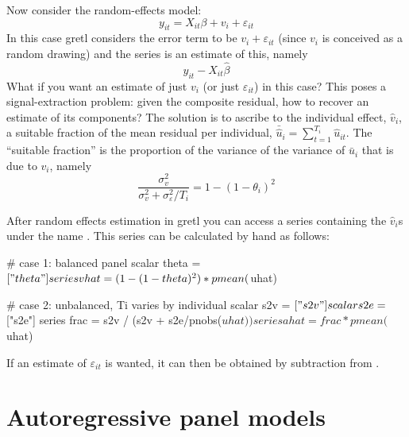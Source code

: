 Now consider the random-effects model:
\[
y_{it} = X_{it}\beta + v_i + \varepsilon_{it}
\]
In this case gretl considers the error term to be
$v_i + \varepsilon_{it}$ (since $v_i$ is conceived as a random
drawing) and the  series is an estimate of this, namely
\[
y_{it} - X_{it}\hat{\beta}
\]
What if you want an estimate of just $v_i$ (or just
$\varepsilon_{it}$) in this case? This poses a signal-extraction
problem: given the composite residual, how to recover an estimate of
its components? The solution is to ascribe to the individual effect,
$\hat{v}_i$, a suitable fraction of the mean residual per individual,
$\bar{\hat{u}}_i = \sum_{t=1}^{T_i} \hat{u}_{it}$. The ``suitable
fraction'' is the proportion of the variance of the variance of
$\bar{u}_i$ that is due to $v_i$, namely
\[
\frac{\sigma^2_v}{\sigma^2_v + \sigma^2_{\varepsilon}/T_i} =
 1 - (1-\theta_i)^2
\]

After random effects estimation in gretl you can access a series
containing the $\hat{v}_i$s under the name . This series
can be calculated by hand as follows:
%
\begin{code}
# case 1: balanced panel
scalar theta = $["theta"]
series vhat = (1 - (1 - theta)^2) * pmean($uhat)

# case 2: unbalanced, Ti varies by individual
scalar s2v = $["s2v"]
scalar s2e = $["s2e"]
series frac = s2v / (s2v + s2e/pnobs($uhat))
series ahat = frac * pmean($uhat)
\end{code}
%
If an estimate of $\varepsilon_{it}$ is wanted, it can then be
obtained by subtraction from .

\section{Autoregressive panel models}
\label{panel-auto}

